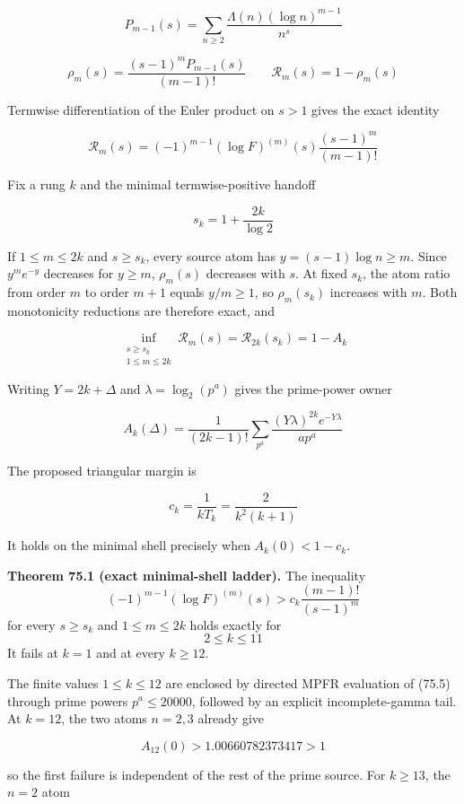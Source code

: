 \documentclass[
  11pt,
]{book}
\renewenvironment{quote}
  {\begin{tcolorbox}[
      enhanced,
      breakable,
      colback=tncream,
      colframe=tnrust,
      boxrule=0.8pt,
      arc=1.5pt,
      left=7pt,
      right=7pt,
      top=6pt,
      bottom=6pt]}
  {\end{tcolorbox}}
\begin{document}
\[
P_{m-1}(s)=\sum_{n\ge2}\frac{\Lambda(n)(\log n)^{m-1}}{n^s}
\]

\[
\rho_m(s)=\frac{(s-1)^mP_{m-1}(s)}{(m-1)!}
\qquad
\mathcal R_m(s)=1-\rho_m(s)
\tag{75.1}
\]

Termwise differentiation of the Euler product on \(s>1\) gives the exact
identity

\[
\boxed{
\mathcal R_m(s)
=(-1)^{m-1}(\log F)^{(m)}(s)
\frac{(s-1)^m}{(m-1)!}}
\tag{75.2}
\]

Fix a rung \(k\) and the minimal termwise-positive handoff

\[
s_k=1+\frac{2k}{\log2}
\tag{75.3}
\]

If \(1\le m\le2k\) and \(s\ge s_k\), every source atom has
\(y=(s-1)\log n\ge m\). Since \(y^me^{-y}\) decreases for \(y\ge m\),
\(\rho_m(s)\) decreases with \(s\). At fixed \(s_k\), the atom ratio
from order \(m\) to order \(m+1\) equals \(y/m\ge1\), so \(\rho_m(s_k)\)
increases with \(m\). Both monotonicity reductions are therefore exact,
and

\[
\boxed{
\inf_{\substack{s\ge s_k\\1\le m\le2k}}\mathcal R_m(s)
=\mathcal R_{2k}(s_k)=1-A_k}
\tag{75.4}
\]

Writing \(Y=2k+\Delta\) and \(\lambda=\log_2(p^a)\) gives the
prime-power owner

\[
A_k(\Delta)
=\frac1{(2k-1)!}
\sum_{p^a}
\frac{(Y\lambda)^{2k}e^{-Y\lambda}}{a p^a}
\tag{75.5}
\]

The proposed triangular margin is

\[
c_k=\frac1{kT_k}=\frac{2}{k^2(k+1)}
\tag{75.6}
\]

It holds on the minimal shell precisely when \(A_k(0)<1-c_k\).

\begin{quote}
\textbf{Theorem 75.1 (exact minimal-shell ladder).} The inequality \[
(-1)^{m-1}(\log F)^{(m)}(s)
>c_k\frac{(m-1)!}{(s-1)^m}
\tag{75.7}
\] for every \(s\ge s_k\) and \(1\le m\le2k\) holds exactly for \[
\boxed{2\le k\le11}
\tag{75.8}
\] It fails at \(k=1\) and at every \(k\ge12\).
\end{quote}

The finite values \(1\le k\le12\) are enclosed by directed MPFR
evaluation of (75.5) through prime powers \(p^a\le20000\), followed by
an explicit incomplete-gamma tail. At \(k=12\), the two atoms \(n=2,3\)
already give

\[
A_{12}(0)>1.00660782373417>1
\tag{75.9}
\]

so the first failure is independent of the rest of the prime source. For
\(k\ge13\), the \(n=2\) atom
\end{document}
